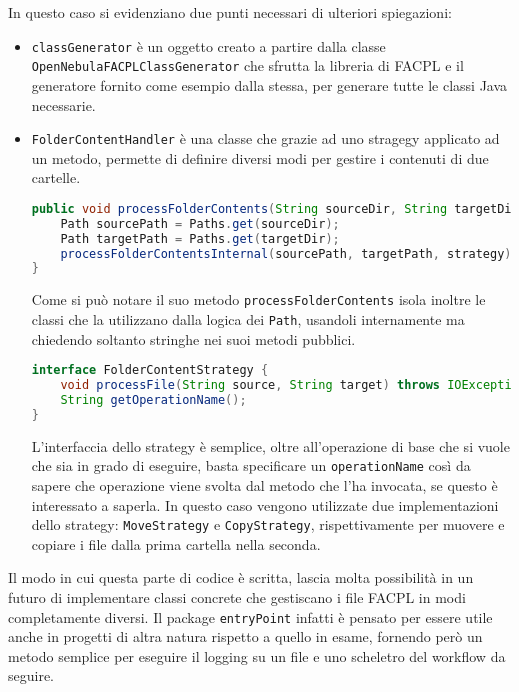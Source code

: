 In questo caso si evidenziano due punti necessari di ulteriori spiegazioni:
\begin{itemize}
    \item \texttt{classGenerator} è un oggetto creato a partire dalla classe \texttt{OpenNebulaFACPLClassGenerator} che sfrutta la libreria di FACPL e il generatore fornito come esempio dalla stessa, per generare tutte le classi Java necessarie.
    \item \texttt{FolderContentHandler} è una classe che grazie ad uno stragegy\cite{GOF} applicato ad un metodo, permette di definire diversi modi per gestire i contenuti di due cartelle.
    \begin{lstlisting}[language=Java, caption=Metodo processFolderContent, label=code:processFolderContent, basicstyle=\fontsize{9.5}{10}\ttfamily]
public void processFolderContents(String sourceDir, String targetDir, FolderContentStrategy strategy) throws IOException {
    Path sourcePath = Paths.get(sourceDir);
    Path targetPath = Paths.get(targetDir);
    processFolderContentsInternal(sourcePath, targetPath, strategy);
}
            \end{lstlisting}
    Come si può notare il suo metodo \texttt{processFolderContents} isola inoltre le classi che la utilizzano dalla logica dei \texttt{Path}, usandoli internamente ma chiedendo soltanto stringhe nei suoi metodi pubblici.
    \begin{lstlisting}[language=Java, caption=Interfaccia FolderContentStrategy, label=code:FolderContentStrategy, basicstyle=\fontsize{9.5}{10}\ttfamily]
interface FolderContentStrategy {
    void processFile(String source, String target) throws IOException;
    String getOperationName();
}
    \end{lstlisting}
    L'interfaccia dello strategy è semplice, oltre all'operazione di base che si vuole che sia in grado di eseguire, basta specificare un \texttt{operationName} così da sapere che operazione viene svolta dal metodo che l'ha invocata, se questo è interessato a saperla.
    In questo caso vengono utilizzate due implementazioni dello strategy: \texttt{MoveStrategy} e \texttt{CopyStrategy}, rispettivamente per muovere e copiare i file dalla prima cartella nella seconda.
\end{itemize}
Il modo in cui questa parte di codice è scritta, lascia molta possibilità in un futuro di implementare classi concrete che gestiscano i file FACPL in modi completamente diversi. Il package \texttt{entryPoint} infatti è pensato per essere utile anche in progetti di altra natura rispetto a quello in esame, fornendo però un metodo semplice per eseguire il logging su un file e uno scheletro del workflow da seguire.

